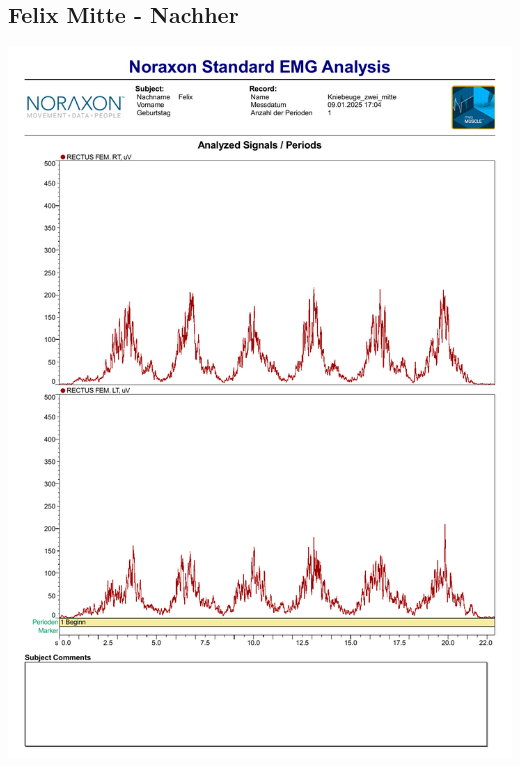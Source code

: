 \subsection*{Felix Mitte - Nachher}
\includegraphics[width=.9\textwidth]{img/pdfs/Felix_2_mitte.pdf}
\clearpage


